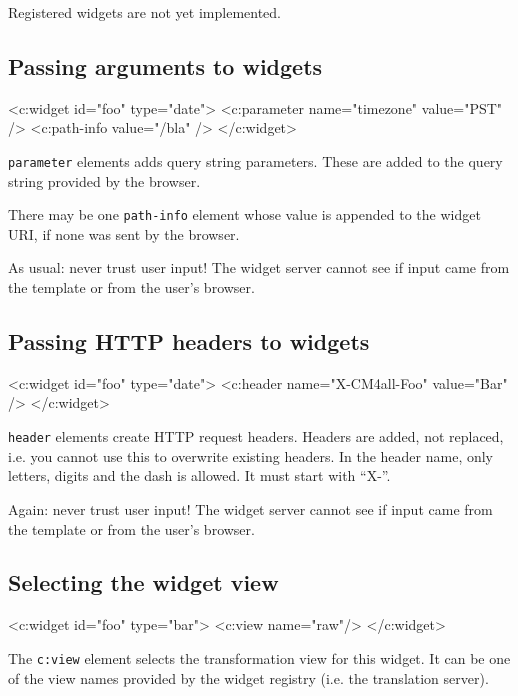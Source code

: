 \documentclass[a4paper,12pt]{article}
\begin{document}
Registered widgets are not yet implemented.

\subsection{Passing arguments to widgets}

\begin{verbatim*}
<c:widget id="foo" type="date">
  <c:parameter name="timezone" value="PST" />
  <c:path-info value="/bla" />
</c:widget>
\end{verbatim*}

\texttt{parameter} elements adds query string parameters.  These are
added to the query string provided by the browser.

There may be one \texttt{path-info} element whose value is appended to
the widget URI, if none was sent by the browser.

As usual: never trust user input!  The widget server cannot see if
input came from the template or from the user's browser.

\subsection{Passing HTTP headers to widgets}

\begin{verbatim*}
<c:widget id="foo" type="date">
  <c:header name="X-CM4all-Foo" value="Bar" />
</c:widget>
\end{verbatim*}

\texttt{header} elements create HTTP request headers.  Headers are
added, not replaced, i.e. you cannot use this to overwrite existing
headers.  In the header name, only letters, digits and the dash is
allowed.  It must start with ``X-''.

Again: never trust user input!  The widget server cannot see if input
came from the template or from the user's browser.

\subsection{Selecting the widget view}

\begin{verbatim*}
<c:widget id="foo" type="bar">
  <c:view name="raw"/>
</c:widget>
\end{verbatim*}

The \texttt{c:view} element selects the transformation view for this
widget.  It can be one of the view names provided by the widget
registry (i.e. the translation server).
\end{document}
